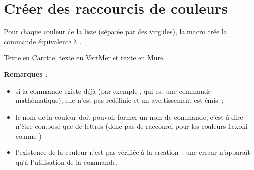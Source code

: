 \documentclass[french,11pt,a4paper]{article}
\begin{document}

\pagebreak

\section{Créer des raccourcis de couleurs}

\begin{codehigh}[language=latex/latex3,style/main=BleuAlice,style/code=BleuAlice]
\end{codehigh}

Pour chaque couleur de la liste (séparée par des virgules), la macro crée la commande  équivalente à .

\begin{demohigh}[language=latex/latex3,style/main=BleuAlice,style/code=BleuAlice]
{\Carotte Texte en Carotte}, {\VertMer texte en VertMer} et {\Mure texte en Mure}.
\end{demohigh}

\smallskip

\textbf{Remarques}~:

\begin{itemize}
	\item si la commande  existe déjà (par exemple , qui est une commande mathématique), elle n'est pas redéfinie et un avertissement est émis~;
	\item le nom de la couleur doit pouvoir former un nom de commande, c'est-à-dire n'être composé que de lettres (donc pas de raccourci pour les couleurs \textsf{flexoki} comme )~;
	\item l'existence de la couleur n'est pas vérifiée à la création~: une erreur n'apparaît qu'à l'utilisation de la commande.
\end{itemize}
\end{document}
